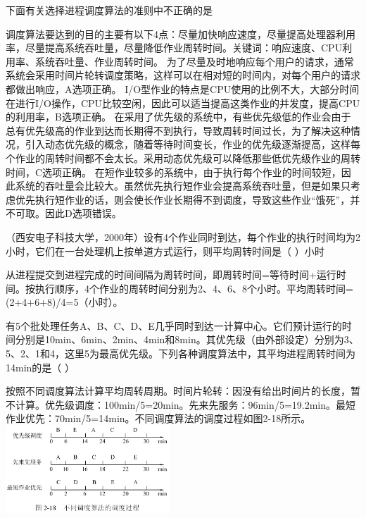 \question 下面有关选择进程调度算法的准则中不正确的是
\par{}
\begin{solution}调度算法要达到的目的主要有以下4点：尽量加快响应速度，尽量提高处理器利用率，尽量提高系统吞吐量，尽量降低作业周转时间。关键词：响应速度、CPU利用率、系统吞吐量、作业周转时间。
为了尽量及时地响应每个用户的请求，通常系统会采用时间片轮转调度策略，这样可以在相对短的时间内，对每个用户的请求都做出响应，A选项正确。
I/O型作业的特点是CPU使用的比例不大，大部分时间在进行I/O操作，CPU比较空闲，因此可以适当提高这类作业的并发度，提高CPU的利用率，B选项正确。
在采用了优先级的系统中，有些优先级低的作业会由于总有优先级高的作业到达而长期得不到执行，导致周转时间过长，为了解决这种情况，引入动态优先级的概念，随着等待时间变长，作业的优先级逐渐提高，这样每个作业的周转时间都不会太长。采用动态优先级可以降低那些低优先级作业的周转时间，C选项正确。
在短作业较多的系统中，由于执行每个作业的时间较短，因此系统的吞吐量会比较大。虽然优先执行短作业会提高系统吞吐量，但是如果只考虑优先执行短作业的话，则会使长作业长期得不到调度，导致这些作业``饿死''，并不可取。因此D选项错误。
\end{solution}
\question （西安电子科技大学，2000年）设有4个作业同时到达，每个作业的执行时间均为2小时，它们在一台处理机上按单道方式运行，则平均周转时间是（
）小时
\par{}
\begin{solution}从进程提交到进程完成的时间间隔为周转时间，即周转时间=等待时间+运行时间。按执行顺序，4个作业的周转时间分别为2、4、6、8个小时。平均周转时间=(2+4+6+8)/4=5（小时）。
\end{solution}
\question 有5个批处理任务A、B、C、D、E几乎同时到达一计算中心。它们预计运行的时间分别是10min、6min、2min、4min和8min。其优先级（由外部设定）分别为3、5、2、1和4，这里5为最高优先级。下列各种调度算法中，其平均进程周转时间为14min的是（
）
\par{}
\begin{solution}按照不同调度算法计算平均周转周期。时间片轮转：因没有给出时间片的长度，暂不计算。优先级调度：100min/5=20min。先来先服务：96min/5=19.2min。最短作业优先：70min/5=14min。不同调度算法的调度过程如图2-18所示。
\includegraphics[width=2.42708in,height=1.28125in]{computerassets/D9AA33FBE58C25E01D7F0F0AA85BAC4D.png}
\end{solution}
